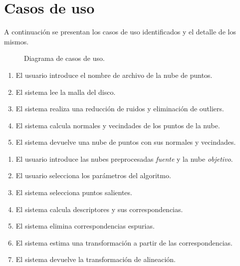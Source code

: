 \chapter{Casos de uso}
A continuación se presentan los casos de uso identificados y el detalle de los mismos.

\begin{figure}
%		
	\caption[Diagrama de casos de uso]{\label{fig:casos_de_uso}Diagrama de casos de uso.}
\end{figure}

		\CUNormal
		\begin{enumerate}
			\item El usuario introduce el nombre de archivo de la nube de puntos.
			\item El sistema lee la malla del disco.
			\item El sistema realiza una reducción de ruidos y eliminación de outliers.
			\item El sistema calcula normales y vecindades de los puntos de la nube.
			\item El sistema devuelve una nube de puntos con sus normales y vecindades.
		\end{enumerate}

		\CUNormal
		\begin{enumerate}
			\item El usuario introduce las nubes preprocesadas \emph{fuente} y la nube \emph{objetivo}. 
			\item El usuario selecciona los parámetros del algoritmo.
			\item El sistema selecciona puntos salientes.
			\item El sistema calcula descriptores y sus correspondencias.
			\item El sistema elimina correspondencias espurias.
			\item El sistema estima una transformación a partir de las correspondencias.
			\item El sistema devuelve la transformación de alineación.
		\end{enumerate}

